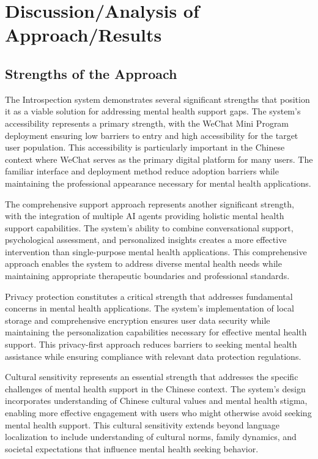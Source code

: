 \section{Discussion/Analysis of Approach/Results}
\label{sec:discussion}

\subsection{Strengths of the Approach}

The Introspection system demonstrates several significant strengths that position it as a viable solution for addressing mental health support gaps. The system's accessibility represents a primary strength, with the WeChat Mini Program deployment ensuring low barriers to entry and high accessibility for the target user population. This accessibility is particularly important in the Chinese context where WeChat serves as the primary digital platform for many users. The familiar interface and deployment method reduce adoption barriers while maintaining the professional appearance necessary for mental health applications.

The comprehensive support approach represents another significant strength, with the integration of multiple AI agents providing holistic mental health support capabilities. The system's ability to combine conversational support, psychological assessment, and personalized insights creates a more effective intervention than single-purpose mental health applications. This comprehensive approach enables the system to address diverse mental health needs while maintaining appropriate therapeutic boundaries and professional standards.

Privacy protection constitutes a critical strength that addresses fundamental concerns in mental health applications. The system's implementation of local storage and comprehensive encryption ensures user data security while maintaining the personalization capabilities necessary for effective mental health support. This privacy-first approach reduces barriers to seeking mental health assistance while ensuring compliance with relevant data protection regulations.

Cultural sensitivity represents an essential strength that addresses the specific challenges of mental health support in the Chinese context. The system's design incorporates understanding of Chinese cultural values and mental health stigma, enabling more effective engagement with users who might otherwise avoid seeking mental health support. This cultural sensitivity extends beyond language localization to include understanding of cultural norms, family dynamics, and societal expectations that influence mental health seeking behavior.

